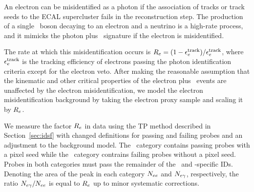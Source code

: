 An electron can be misidentified as a photon if the association of tracks or track seeds to the ECAL supercluster fails in the reconstruction step. 
The production of a single \PW\ boson decaying to an electron and a neutrino is a high-rate process, and it mimicks the photon plus \met\ signature if the electron is misidentified.

The rate  at which this misidentification occurs is $R_{{e}} = (1 - \epsilon_{{e}}^{\text{track}}) / \epsilon_{{e}}^{\text{track}}$, where $\epsilon_{{e}}^{\text{track}}$ is the tracking efficiency of electrons passing the photon identification criteria except for the electron veto.
After making the reasonable assumption that the kinematic and other critical properties of the electron plus \met\ events are unaffected by the electron misidentification, we model the electron misidentification background by taking the electron proxy sample and scaling it by $R_{{e}}$.


We measure the factor $R_{{e}}$ in data using the TP method described in Section~\ref{sec:idsf} with changed definitions for passing and failing probes and an adjustment to the background model.
The \Pe\Pe\ category contains passing probes with a pixel seed while the \Pe\Pgg\ category contrains failing probes without a pixel seed.
Probes in both categories must pass the remainder of the \egamma\ and \Pgg-specific IDs.
Denoting the area of the peak in each category  $N_{{e}{e}}$ and $N_{{e}\gamma}$, respectively, the ratio $N_{{e}\gamma} / N_{{e}{e}}$ is equal to $R_{{e}}$ up to minor systematic corrections.

